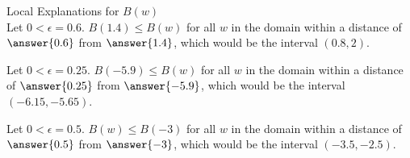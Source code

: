 \documentclass{ximera}
\begin{document}
\begin{explanation}
Local Explanations for $B(w)$ \\

Let $0 < \epsilon = 0.6$.  $B(1.4) \leq B(w)$ for all $w$ in the domain within a distance of $\answer{0.6}$ from $\answer{1.4}$, which would be the interval $(0.8, 2)$.

Let $0 < \epsilon = 0.25$.  $B(-5.9) \leq B(w)$ for all $w$ in the domain within a distance of $\answer{0.25}$ from $\answer{-5.9}$, which would be the interval $(-6.15, -5.65)$.

Let $0 < \epsilon = 0.5$.  $B(w) \leq B(-3)$ for all $w$ in the domain within a distance of $\answer{0.5}$ from $\answer{-3}$, which would be the interval $(-3.5, -2.5)$.
\end{explanation}
\end{document}

